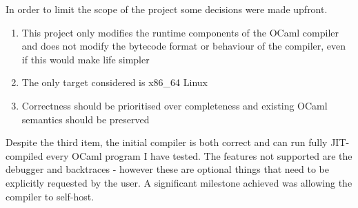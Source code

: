 In order to limit the scope of the project some decisions were made upfront.

\begin{enumerate}
    \item This project only modifies the runtime components of the OCaml compiler and does not
          modify the bytecode format or behaviour of the compiler, even if this would make life
          simpler
    \item The only target considered is x86\_64 Linux
    \item Correctness should be prioritised over completeness and existing OCaml semantics should
          be preserved
\end{enumerate}

Despite the third item, the initial compiler is both correct and can run fully JIT-compiled every
OCaml program I have tested. The features not supported are the debugger and backtraces - however
these are optional things that need to be explicitly requested by the user. A significant milestone
achieved was allowing the compiler to self-host.
